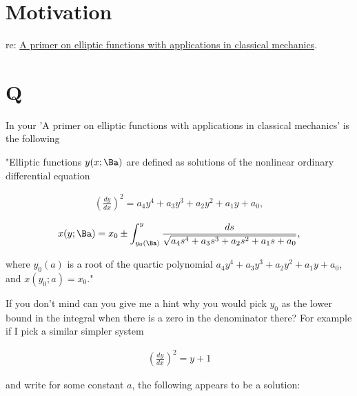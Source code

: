 

\title{}

\beginArtNoToc

\section{Motivation}

re: 
\href{http://arxiv.org/abs/0711.4064}{A primer on elliptic functions with applications in classical mechanics}.

\section{Q}

In your 'A primer on elliptic functions with applications in classical mechanics' is the following

"Elliptic functions $y(x; \Ba)$ are defined as solutions of the nonlinear ordinary differential equation

\begin{align*}
\left(\frac{dy}{dx}\right)^2 = a_4 y^4 + a_3 y^3 + a_2 y^2 + a_1 y + a_0,
\end{align*}

\begin{align*}
x(y; \Ba) = x_0 \pm \int_{y_0(\Ba)}^y \frac{ds}{\sqrt{
a_4 s^4 + a_3 s^3 + a_2 s^2 + a_1 s + a_0
}},
\end{align*}

where $y_0(a)$ is a root of the quartic polynomial $a_4 y^4 + a_3 y^3 + a_2 y^2 + a_1 y + a_0$, and $x(y_0; a) = x_0$."

If you don't mind can you give me a hint why you would pick $y_0$ as the lower bound in the integral when there is a zero in the denominator there?  For example if I pick a similar simpler system

\begin{align*}
\left(\frac{dy}{dx}\right)^2 = y + 1
\end{align*}

and write for some constant $a$, the following appears to be a solution:


